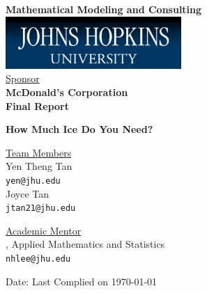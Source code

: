 \documentclass[oneside,12pt]{report}
\begin{document}
\def\thefootnote{\fnsymbol{footnote}}

\thispagestyle{empty}

\def\shiftdowna{0.32in}  %
\def\shiftdownb{0.22in}  %


\begin{center}
\textbf{{\large Mathematical Modeling and Consulting }}\\

\vspace \shiftdowna
\includegraphics[width=0.5\textwidth]{jhu.png}\\

\vspace \shiftdowna
\underline {Sponsor}\\ 
\vspace{5pt}
\textbf{\large McDonald's Corporation} \\
\vspace\shiftdowna
\textbf{{Final Report}}

\vspace \shiftdowna
\textbf{{\Large How Much Ice Do You Need?}}

\vspace{0.35in}
\underline {Team Members}\\
\vspace{5pt}
Yen Theng Tan \\
\texttt{yen@jhu.edu} \\
\vspace{10pt}
Joyce Tan \\
\texttt{jtan21@jhu.edu}

\vspace \shiftdownb
\underline {Academic Mentor} \\
\vspace{5pt}
, Applied Mathematics and Statistics\\
\texttt{nhlee@jhu.edu}


\vspace \shiftdowna
Date: Last Complied on \today

\end{center}
\end{document}
